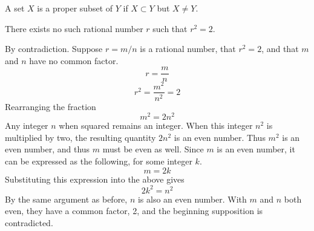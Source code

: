 \begin{defn-dan}
  A set $X$ is a proper subset of $Y$ if $X\subset Y$ but $X\neq Y$.
\end{defn-dan}

\begin{example}
  There exists no such rational number $r$ such that $r^{2}=2$.

  \begin{proof-dan}
    By contradiction.
    Suppose $r=m/n$ is a rational number, that $r^{2}=2$, and that $m$ and $n$ have no common factor.
    \begin{equation*}
      r=\frac{m}{n}
    \end{equation*}
    \begin{equation*}
      r^{2}=\frac{m^{2}}{n^{2}}=2
    \end{equation*}
    Rearranging the fraction
    \begin{equation*}
      m^{2}=2n^{2}
    \end{equation*}
    Any integer $n$ when squared remains an integer.
    When this integer $n^{2}$ is multiplied by two, the resulting quantity $2n^{2}$ is an even number.
    Thus $m^{2}$ is an even number, and thus $m$ must be even as well.
    Since $m$ is an even number, it can be expressed as the following, for some integer $k$.
    \begin{equation*}
      m=2k
    \end{equation*}
    Substituting this expression into the above gives
    \begin{equation*}
      2k^{2}=n^{2}
    \end{equation*}
    By the same argument as before, $n$ is also an even number.
    With $m$ and $n$ both even, they have a common factor, 2, and the beginning supposition is contradicted.
  \end{proof-dan}
\end{example}


